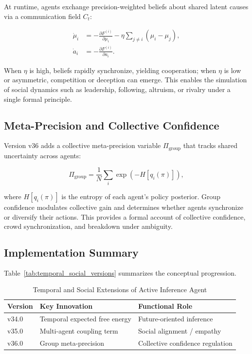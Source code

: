 \documentclass[9pt]{elife}
\begin{document}
At runtime, agents exchange precision-weighted beliefs
about shared latent causes via a communication field $C_t$:

\begin{align}
\dot{\mu}_i &= -\frac{\partial F^{(i)}}{\partial \mu_i}
              - \eta \sum_{j \neq i} (\mu_i - \mu_j), \\
\dot{a}_i   &= -\frac{\partial F^{(i)}}{\partial a_i}.
\end{align}

When $\eta$ is high, beliefs rapidly synchronize, yielding cooperation;
when $\eta$ is low or asymmetric, competition or deception can emerge.
This enables the simulation of social dynamics such as
leadership, following, altruism, or rivalry under a single formal principle.

\subsection{Meta-Precision and Collective Confidence}

Version v36 adds a collective meta-precision variable $\Pi_{\mathrm{group}}$
that tracks shared uncertainty across agents:

\[
\Pi_{\mathrm{group}} = \frac{1}{N} \sum_i \exp(-H[q_i(\pi)]),
\]

where $H[q_i(\pi)]$ is the entropy of each agent’s policy posterior.
Group confidence modulates collective gain and
determines whether agents synchronize or diversify their actions.
This provides a formal account of collective confidence,
crowd synchronization, and breakdown under ambiguity.

\subsection{Implementation Summary}

Table~\ref{tab:temporal_social_versions} summarizes the conceptual progression.

\begin{table}[h]
\centering
\caption{Temporal and Social Extensions of Active Inference Agent}
\begin{tabular}{l l l}
\hline
Version & Key Innovation & Functional Role \\
\hline
v34.0 & Temporal expected free energy & Future-oriented inference \\
v35.0 & Multi-agent coupling term & Social alignment / empathy \\
v36.0 & Group meta-precision & Collective confidence regulation \\
\hline
\end{tabular}
\end{table}
\end{document}
